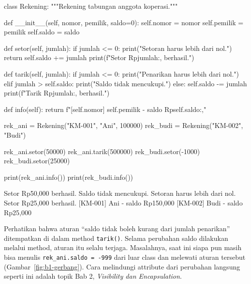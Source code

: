 \begin{kode}[rekening.py]
class Rekening:
    """Rekening tabungan anggota koperasi."""

    def __init__(self, nomor, pemilik, saldo=0):
        self.nomor = nomor
        self.pemilik = pemilik
        self.saldo = saldo

    def setor(self, jumlah):
        if jumlah <= 0:
            print("Setoran harus lebih dari nol.")
            return
        self.saldo += jumlah
        print(f"Setor Rp{jumlah:,} berhasil.")

    def tarik(self, jumlah):
        if jumlah <= 0:
            print("Penarikan harus lebih dari nol.")
        elif jumlah > self.saldo:
            print("Saldo tidak mencukupi.")
        else:
            self.saldo -= jumlah
            print(f"Tarik Rp{jumlah:,} berhasil.")

    def info(self):
        return f"[{self.nomor}] {self.pemilik} - saldo Rp{self.saldo:,}"


rek_ani = Rekening("KM-001", "Ani", 100000)
rek_budi = Rekening("KM-002", "Budi")

rek_ani.setor(50000)
rek_ani.tarik(500000)
rek_budi.setor(-1000)
rek_budi.setor(25000)

print(rek_ani.info())
print(rek_budi.info())
\end{kode}

\begin{keluaran}
Setor Rp50,000 berhasil.
Saldo tidak mencukupi.
Setoran harus lebih dari nol.
Setor Rp25,000 berhasil.
[KM-001] Ani - saldo Rp150,000
[KM-002] Budi - saldo Rp25,000
\end{keluaran}

Perhatikan bahwa aturan ``saldo tidak boleh kurang dari jumlah penarikan'' ditempatkan di dalam method \texttt{tarik()}. Selama perubahan saldo dilakukan melalui method, aturan itu selalu terjaga. Masalahnya, saat ini siapa pun masih bisa menulis \texttt{rek\_ani.saldo = -999} dari luar class dan melewati aturan tersebut (Gambar~\ref{fig:b1-gerbang}). Cara melindungi attribute dari perubahan langsung seperti ini adalah topik Bab 2, \emph{Visibility dan Encapsulation}.


